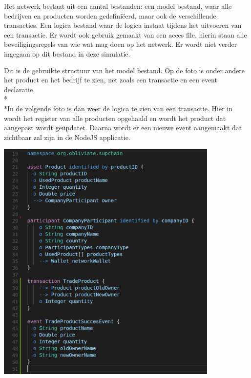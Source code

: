 \documentclass[fleqn,a4paper,12pt]{book}
\begin{document}
Het netwerk bestaat uit een aantal bestanden: een model bestand, waar alle bedrijven en producten worden gedefiniëerd, maar ook de verschillende transacties. Een logica bestand waar de logica instaat tijdens het uitvoeren van een transactie. Er wordt ook gebruik gemaakt van een acces file, hierin staan alle beveiligingsregels van wie wat mag doen op het netwerk. Er wordt niet verder ingegaan op dit bestand in deze simulatie.

Dit is de gebruikte structuur van het model bestand. Op de foto is onder andere het product en het bedrijf te zien, net zoals een transactie en een event declaratie.\\*\\*In de volgende foto is dan weer de logica te zien van een transactie. Hier in wordt het register van alle producten opgehaald en wordt het product dat aangepast wordt geüpdatet. Daarna wordt er een nieuwe event aangemaakt dat zichtbaar zal zijn in de NodeJS applicatie.

\begin{center}
	\includegraphics[width=11cm]{img/model-example}\\[1cm]
\end{center}
\end{document}
